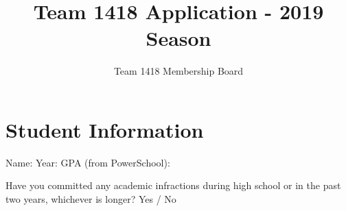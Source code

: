 \documentclass{exams}
\begin{document}
\title{Team 1418 Application - 2019 Season}
\author{Team 1418 Membership Board}
\maketitle

\section{Student Information}
Name: \underline{\hspace{3cm}}
Year: \underline{\hspace{3cm}}
GPA (from PowerSchool): \underline{\hspace{2cm}}

Have you committed any academic infractions during high school or in the past two years, whichever is longer? Yes / No
\end{document}
